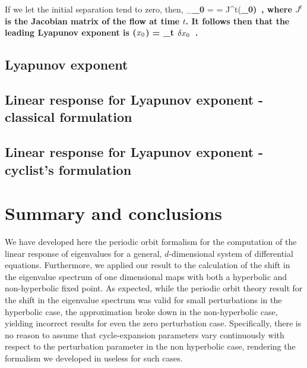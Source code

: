 \documentclass[aps,pre,
                showpacs,
                twocolumn,
                groupedaddress,
                superscriptaddress,
                floatfix]{revtex4-1}
\begin{document}
If we let the initial separation tend to zero, then,
\beq
\lim_{\bf \delta \ssp_{0} } 
= 
= J^{t}(\bf \ssp_{0})
\,,
\eeq
where $J^{t}$ is the Jacobian matrix of the flow at time $t$. It follows
then that the leading Lyapunov exponent is
\beq
\lambda(\textbf{$\ssp_{0}$})
= \lim_{t\rightarrow \infty}
\ln {}
         {\Vert \textbf{$\delta \ssp_{0}$} \Vert}
\,.
\eeq

\subsection{Lyapunov exponent }

\subsection{Linear response for Lyapunov exponent - classical formulation}
\label{sect:LinrespLyapClass}

\subsection{Linear response for Lyapunov exponent - cyclist's formulation}
\label{sect:LinrespLyapCycl}


\section{Summary and conclusions}
\label{sect:concl}

We have developed here the periodic orbit formalism for the computation of the
linear response of eigenvalues for a general, $d$-dimensional system of
differential equations. Furthermore, we applied our result to the
calculation of the shift in the eigenvalue spectrum of one dimensional
maps with both a hyperbolic and non-hyperbolic fixed point. As expected,
while the periodic orbit theory result for the shift in the eigenvalue
spectrum was valid for small perturbations in the hyperbolic case, the
approximation broke down in the non-hyperbolic case, yielding incorrect
results for even the zero perturbation case. Specifically, there is no
reason to assume that cycle-expansion parameters vary continuously with
respect to the perturbation parameter in the non hyperbolic case,
rendering the formalism we developed in  useless for such cases.
\end{document}
